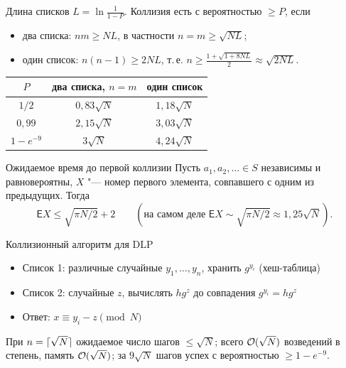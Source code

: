 \documentclass{ca-slides}
\begin{document}
\begin{canvasframe}{Длина списков}
  $L = \ln\frac{1}{1 - P}$. Коллизия есть с вероятностью $\ge P$, если
  \begin{itemize}
    \item два списка: $nm \ge NL$, в частности $n = m \ge \sqrt{NL}$;
    \item один список: $n(n - 1) \ge 2NL$, т.\,е. $n \ge \frac{1 + \sqrt{1 + 8NL}}{2}
      \approx \sqrt{2NL}$.
  \end{itemize}
  \begin{center}
  \begin{tabular}{c|c|c}
    $P$ & два списка, $n = m$ & один список \\ \hline
    $1/2$ & $0{,}83\sqrt N$ & $1{,}18\sqrt N$ \\
    $0{,}99$ & $2{,}15\sqrt N$ & $3{,}03\sqrt N$ \\
    $1 - e^{-9}$ & $3\sqrt N$ & $4{,}24\sqrt N$
  \end{tabular}
  \end{center}
\end{canvasframe}

\begin{theoremframe}{Ожидаемое время до первой коллизии}
  Пусть $a_1, a_2, \dots \in S$ независимы и равновероятны, $X$ "--- номер первого элемента,
  совпавшего с одним из предыдущих. Тогда
  \[\mathsf{E}X \le \sqrt{\pi N/2} + 2 \qquad (\text{на самом деле } \mathsf{E}X \sim
  \sqrt{\pi N/2} \approx 1{,}25\sqrt N).\]
\end{theoremframe}

\begin{canvasframe}{Коллизионный алгоритм для DLP}
  \begin{itemize}
    \item Список 1: различные случайные $y_1, \dots, y_n$, хранить $g^{y_i}$ (хеш-таблица)
    \item Список 2: случайные $z$, вычислять $h g^{z}$ до совпадения $g^{y_i} = h g^{z}$
    \item Ответ: $x \equiv y_i - z \pmod N$
  \end{itemize}
  \begin{theorem}
    При $n = \lceil\sqrt N\rceil$ ожидаемое число шагов $\le \sqrt N$; всего $\mathcal{O}(\sqrt N)$
    возведений в степень, память $\mathcal{O}(\sqrt N)$; за $9\sqrt N$ шагов успех с вероятностью
    $\ge 1 - e^{-9}$.
  \end{theorem}
\end{canvasframe}
\end{document}
